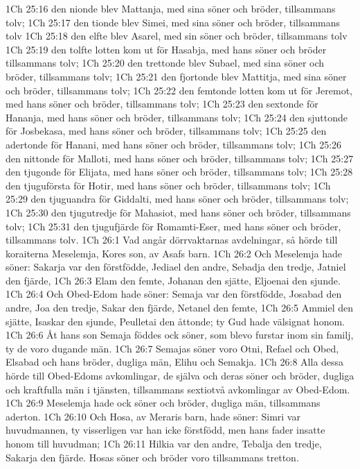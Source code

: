 1Ch 25:16  den nionde blev Mattanja, med sina söner och bröder, tillsammans tolv;
1Ch 25:17  den tionde blev Simei, med sina söner och bröder, tillsammans tolv
1Ch 25:18  den elfte blev Asarel, med sin söner och bröder, tillsammans tolv
1Ch 25:19  den tolfte lotten kom ut för Hasabja, med hans söner och bröder tillsammans tolv;
1Ch 25:20  den trettonde blev Subael, med sina söner och bröder, tillsammans tolv;
1Ch 25:21  den fjortonde blev Mattitja, med sina söner och bröder, tillsammans tolv;
1Ch 25:22  den femtonde lotten kom ut för Jeremot, med hans söner och bröder, tillsammans tolv;
1Ch 25:23  den sextonde för Hananja, med hans söner och bröder, tillsammans tolv;
1Ch 25:24  den sjuttonde för Josbekasa, med hans söner och bröder, tillsammans tolv;
1Ch 25:25  den adertonde för Hanani, med hans söner och bröder, tillsammans tolv;
1Ch 25:26  den nittonde för Malloti, med hans söner och bröder, tillsammans tolv;
1Ch 25:27  den tjugonde för Elijata, med hans söner och bröder, tillsammans tolv;
1Ch 25:28  den tjuguförsta för Hotir, med hans söner och bröder, tillsammans tolv;
1Ch 25:29  den tjuguandra för Giddalti, med hans söner och bröder, tillsammans tolv;
1Ch 25:30  den tjugutredje för Mahasiot, med hans söner och bröder, tillsammans tolv;
1Ch 25:31  den tjugufjärde för Romamti-Eser, med hans söner och bröder, tillsammans tolv.
1Ch 26:1  Vad angår dörrvaktarnas avdelningar, så hörde till koraiterna Meselemja, Kores son, av Asafs barn.
1Ch 26:2  Och Meselemja hade söner: Sakarja var den förstfödde, Jediael den andre, Sebadja den tredje, Jatniel den fjärde,
1Ch 26:3  Elam den femte, Johanan den sjätte, Eljoenai den sjunde.
1Ch 26:4  Och Obed-Edom hade söner: Semaja var den förstfödde, Josabad den andre, Joa den tredje, Sakar den fjärde, Netanel den femte,
1Ch 26:5  Ammiel den sjätte, Isaskar den sjunde, Peulletai den åttonde; ty Gud hade välsignat honom.
1Ch 26:6  Åt hans son Semaja föddes ock söner, som blevo furstar inom sin familj, ty de voro dugande män.
1Ch 26:7  Semajas söner voro Otni, Refael och Obed, Elsabad och hans bröder, dugliga män, Elihu och Semakja.
1Ch 26:8  Alla dessa hörde till Obed-Edoms avkomlingar, de själva och deras söner och bröder, dugliga och kraftfulla män i tjänsten, tillsammans sextiotvå avkomlingar av Obed-Edom.
1Ch 26:9  Meselemja hade ock söner och bröder, dugliga män, tillsammans aderton.
1Ch 26:10  Och Hosa, av Meraris barn, hade söner: Simri var huvudmannen, ty visserligen var han icke förstfödd, men hans fader insatte honom till huvudman;
1Ch 26:11  Hilkia var den andre, Tebalja den tredje, Sakarja den fjärde. Hosas söner och bröder voro tillsammans tretton.
